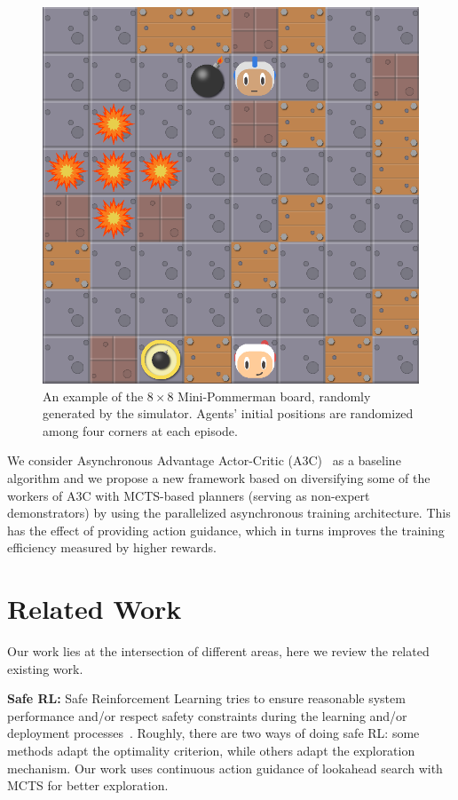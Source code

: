 \documentclass[letterpaper]{article} %
\begin{document}
\begin{figure}
\centering
\includegraphics[scale=0.26]{pom8x8.png}
\caption{An example of the $8 \times 8$ Mini-Pommerman board, randomly generated by the simulator. Agents' initial positions are randomized among four corners at each episode.}
\label{fig:pom8x8}
\end{figure}

We consider Asynchronous Advantage Actor-Critic (A3C)~\cite{mnih2016asynchronous} as a baseline algorithm and we propose a new framework based on diversifying some of the workers of A3C with MCTS-based planners (serving as non-expert demonstrators) by using the parallelized asynchronous training architecture. This has the effect of providing action guidance, which in turns improves the training efficiency measured by higher rewards.

\section{Related Work}

Our work lies at the intersection of different areas, here we review the related existing work.

\textbf{Safe RL:} Safe Reinforcement Learning tries to ensure reasonable system performance and/or respect safety constraints during the learning and/or deployment processes~\cite{garcia2015comprehensive}. Roughly, there are two ways of doing safe RL: some methods adapt the optimality criterion, while others adapt the exploration mechanism. Our work uses continuous action guidance of lookahead search with MCTS for better exploration.
\end{document}
